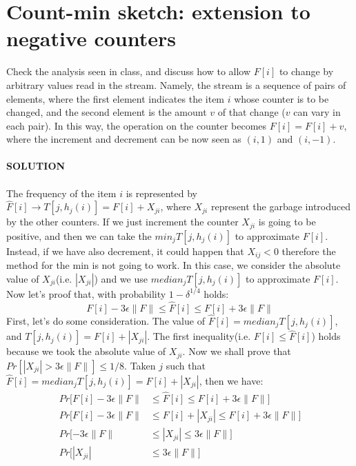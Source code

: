 \documentclass[a4paper]{article}
\begin{document}
\section*{Count-min sketch: extension to negative counters}
Check the analysis seen in class, and discuss how to allow $F[i]$ to change by arbitrary values read in the stream. Namely, the stream is a sequence of pairs of elements, where the first element indicates the item $i$ whose counter is to be changed, and the second element is the amount $v$ of that change ($v$ can vary in each pair). In this way, the operation on the counter becomes $F[i] = F[i]+v$, where the increment and decrement can be now seen as $(i, 1)$ and $(i, −1)$.
\\
\\
\textbf{SOLUTION}
\\
\\
The frequency of the item $i$ is represented by $\hat{F}[i]\rightarrow T[j, h_j(i)] = F[i] + X_{ji}$, where $X_{ji}$ represent the garbage introduced by the other counters. If we just increment the counter $X_{ji}$ is going to be positive, and then we can take the $min_j T[j,h_j(i)]$ to approximate $F[i]$.
Instead, if we have also decrement, it could happen that $X_{ij}<0$ therefore the method for the min is not going to work. In this case, we consider the absolute value of $X_{ji}$(i.e. $|X_{ji}|$) and  we use $median_j T[j, h_j(i)]$ to approximate $F[i]$. Now let's proof that, with probability $1-\delta^{1/4}$ holds:
\begin{equation}
F[i] - 3\epsilon \|F\|\leq \hat{F}[i] \leq F[i]  + 3\epsilon \|F\|
\nonumber
\end{equation}
First, let's do some consideration. The value of $\hat{F}[i]=median_j T[j, h_j(i)]$, and $T[j, h_j(i)]= F[i] +|X_{ji}| $. The first inequality(i.e. $F[i] \leq \hat{F}[i]$) holds because we took the absolute value of $X_{ji}$. Now we shall prove that $Pr[|X_{ji}|>   3\epsilon \|F\| ] \leq 1/8 $. Taken $j$ such that $\hat{F}[i]=median_j T[j, h_j(i)] = F[i] +|X_{ji}|$, then we have:
\begin{align*}
Pr[F[i] - 3\epsilon \|F\|&\leq \hat{F}[i] \leq F[i]  + 3\epsilon \|F\|]\\
Pr[F[i] - 3\epsilon \|F\|&\leq F[i] +|X_{ji}| \leq F[i]  + 3\epsilon \|F\|]\\
Pr[- 3\epsilon \|F\|&\leq |X_{ji}| \leq 3\epsilon \|F\|]\\
Pr[|X_{ji}|&\leq 3\epsilon \|F\|]\\
\end{align*}
\end{document}
